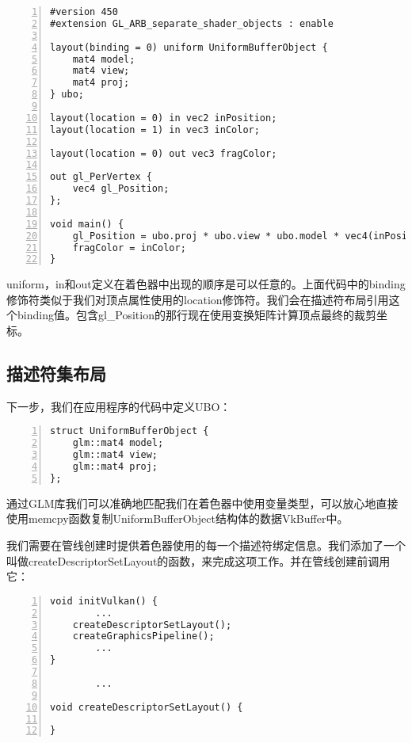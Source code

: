 \documentclass{ctexart}
\begin{document}
\begin{lstlisting}[language={[ANSI]C},keywordstyle=\color{blue!70},commentstyle=\color{red!50!green!50!blue!50},frame=shadowbox, rulesepcolor=\color{red!20!green!20!blue!20},basicstyle=\small,numbers=left, numberstyle=\tiny,breaklines=true]
#version 450
#extension GL_ARB_separate_shader_objects : enable

layout(binding = 0) uniform UniformBufferObject {
	mat4 model;
	mat4 view;
	mat4 proj;
} ubo;

layout(location = 0) in vec2 inPosition;
layout(location = 1) in vec3 inColor;

layout(location = 0) out vec3 fragColor;

out gl_PerVertex {
	vec4 gl_Position;
};

void main() {
	gl_Position = ubo.proj * ubo.view * ubo.model * vec4(inPosition, 0.0, 1.0);
	fragColor = inColor;
}
\end{lstlisting}

uniform，in和out定义在着色器中出现的顺序是可以任意的。上面代码中的binding修饰符类似于我们对顶点属性使用的location修饰符。我们会在描述符布局引用这个binding值。包含gl\_Position的那行现在使用变换矩阵计算顶点最终的裁剪坐标。

\subsection{描述符集布局}

下一步，我们在应用程序的代码中定义UBO：

\begin{lstlisting}[language={[ANSI]C},keywordstyle=\color{blue!70},commentstyle=\color{red!50!green!50!blue!50},frame=shadowbox, rulesepcolor=\color{red!20!green!20!blue!20},basicstyle=\small,numbers=left, numberstyle=\tiny,breaklines=true]
struct UniformBufferObject {
	glm::mat4 model;
	glm::mat4 view;
	glm::mat4 proj;
};
\end{lstlisting}

通过GLM库我们可以准确地匹配我们在着色器中使用变量类型，可以放心地直接使用memcpy函数复制UniformBufferObject结构体的数据VkBuffer中。

我们需要在管线创建时提供着色器使用的每一个描述符绑定信息。我们添加了一个叫做createDescriptorSetLayout的函数，来完成这项工作。并在管线创建前调用它：

\begin{lstlisting}[language={[ANSI]C},keywordstyle=\color{blue!70},commentstyle=\color{red!50!green!50!blue!50},frame=shadowbox, rulesepcolor=\color{red!20!green!20!blue!20},basicstyle=\small,numbers=left, numberstyle=\tiny,breaklines=true]
void initVulkan() {
		...
	createDescriptorSetLayout();
	createGraphicsPipeline();
		...
}

		...

void createDescriptorSetLayout() {

}
\end{lstlisting}
\end{document}
